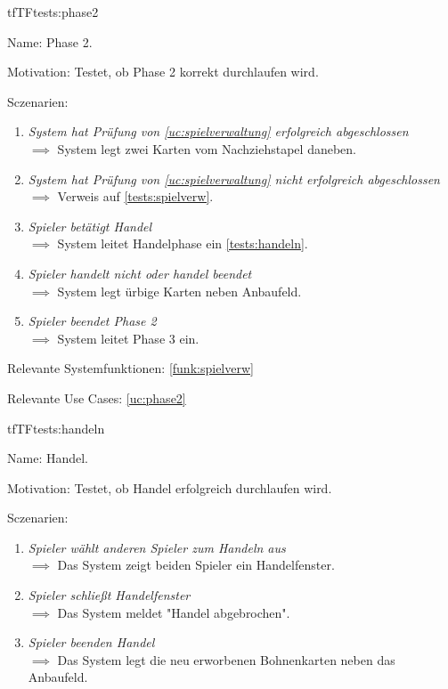 \begin{description}[leftmargin=5em, style=sameline]
\begin{lhp}{tf}{TF}{tests:phase2}
	\item [Name:] Phase 2.
	\item [Motivation:] Testet, ob Phase 2 korrekt durchlaufen wird.
	\item [Sczenarien:] \hfill
	\begin{enumerate}
		\item \textit{System hat Prüfung von \ref{uc:spielverwaltung} erfolgreich abgeschlossen} \\ $\implies$ System legt zwei Karten vom Nachziehstapel daneben.
		\item \textit{System hat Prüfung von \ref{uc:spielverwaltung} nicht erfolgreich abgeschlossen} \\ $\implies$ Verweis auf \ref{tests:spielverw}.
		\item \textit{Spieler betätigt Handel} \\ $\implies$ System leitet Handelphase ein \ref{tests:handeln}.
		\item \textit{Spieler handelt nicht oder handel beendet} \\ $\implies$ System legt ürbige Karten neben Anbaufeld.
		\item \textit{Spieler beendet Phase 2} \\ $\implies$ System leitet Phase 3 ein.		
	\end{enumerate}
	\item [Relevante Systemfunktionen:] \ref{funk:spielverw}
	\item [Relevante Use Cases:] \ref{uc:phase2}
\end{lhp}

\begin{lhp}{tf}{TF}{tests:handeln}
	\item [Name:] Handel.
	\item [Motivation:] Testet, ob Handel erfolgreich durchlaufen wird.
	\item [Sczenarien:] \hfill
	\begin{enumerate}
		\item \textit{Spieler wählt anderen Spieler zum Handeln aus} \\ $\implies$ Das System zeigt beiden Spieler ein Handelfenster.
		\item \textit{Spieler schließt Handelfenster} \\ $\implies$ Das System meldet "{}Handel abgebrochen"{}.
		\item \textit{Spieler beenden Handel} \\ $\implies$ Das System legt die neu erworbenen Bohnenkarten neben das Anbaufeld.
	

\end{enumerate}
\end{lhp}
\end{description}
